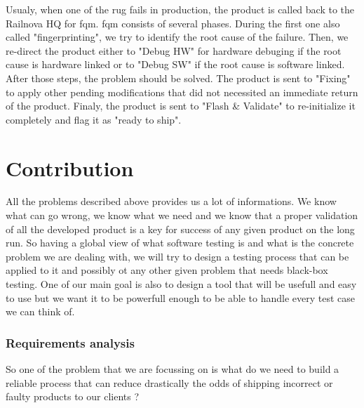 \documentclass[12pt]{article}
\begin{document}
Usualy, when one of the \gls{rug} fails in production, the product is called back to the Railnova HQ for \gls{fqm}. \gls{fqm} consists of several phases. During the first one also called "fingerprinting", we try to identify the root cause of the failure. Then, we re-direct the product either to "Debug HW" for hardware debuging if the root cause is hardware linked or to "Debug SW" if the root cause is software linked. After those steps, the problem should be solved. The product is sent to "Fixing" to apply other pending modifications that did not necessited an immediate return of the product. Finaly, the product is sent to "Flash \& Validate" to re-initialize it completely and flag it as "ready to ship".\\



\clearpage
\part{Contribution}

All the problems described above provides us a lot of informations. We know what can go wrong, we know what we need and we know that a proper validation of all the developed product is a key for success of any given product on the long run. So having a global view of what software testing is and what is the concrete problem we are dealing with, we will try to design a testing process that can be applied to it and possibly ot any other given problem that needs black-box testing. One of our main goal is also to design a tool that will be usefull and easy to use but we want it to be powerfull enough to be able to handle every test case we can think of.\\

\clearpage
\section{Requirements analysis}

So one of the problem that we are focussing on is what do we need to build a reliable process that can reduce drastically the odds of shipping incorrect or faulty products to our clients ?\\
\end{document}
